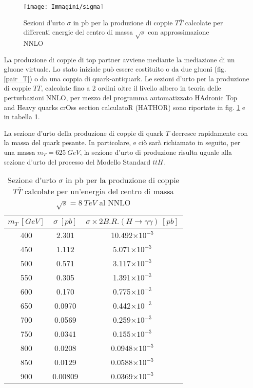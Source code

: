 \begin{figure}[!htbp]
\begin{center}
\texttt{[image: Immagini/sigma]}
\end{center}
\caption{Sezioni d'urto $\sigma$ in pb per la produzione di coppie $T\bar{T}$ calcolate per differenti energie
del centro di massa $\sqrt{s}$ con approssimazione NNLO}
\label{pair_T_sigmas}
\end{figure}

\medskip
La produzione di coppie di top partner avviene mediante la mediazione di un gluone virtuale. Lo stato iniziale può essere costituito o
da due gluoni (fig. \ref{pair_T}) o da una coppia di quark-antiquark.
\newline
Le sezioni d'urto per la produzione di coppie $T\bar{T}$, calcolate fino a 2 ordini oltre il livello albero in teoria delle perturbazioni \acs{NNLO}, per mezzo del 
programma automatizzato HAdronic Top and Heavy
quarks crOss section calculatoR (HATHOR) \cite{sigmas} sono riportate in fig. \ref{pair_T_sigmas} e in tabella \ref{cross_tab}.


\medskip
La sezione d'urto della produzione di coppie di quark $T$ decresce rapidamente con la massa del quark pesante.
\newline
In particolare, e ciò sarà richiamato in seguito, per una massa $m_{T}=625 ~GeV$, la sezione d'urto
di produzione risulta uguale alla sezione d'urto del processo del Modello Standard $t\bar{t}H$.


\begin {table}[!hbtp]
\begin{center}
\begin{tabular}{ccc}
\hline
$m_{T} ~[GeV]$ & $\sigma ~[pb]$ &$\sigma\times 2 B.R.(H\rightarrow\gamma\gamma) ~[pb]$\\
\hline
400 & 2.301& 10.492$\times 10^{-3}$\\
450 & 1.112& 5.071$\times 10^{-3}$\\
500 & 0.571& 3.117$\times 10^{-3}$\\
550 & 0.305& 1.391$\times 10^{-3}$\\
600 & 0.170& 0.775$\times 10^{-3}$\\
650 & 0.0970& 0.442$\times 10^{-3}$\\
700 & 0.0569& 0.259$\times 10^{-3}$\\
750 & 0.0341& 0.155$\times 10^{-3}$\\
800 & 0.0208& 0.0948$\times 10^{-3}$\\
850 & 0.0129& 0.0588$\times 10^{-3}$\\
900 & 0.00809& 0.0369$\times 10^{-3}$\\
\hline
\end{tabular}
\caption{Sezione d'urto $\sigma$ in pb per la produzione di coppie $T\bar{T}$ calcolate per un'energia del centro di massa
$\sqrt{s}=8 ~TeV$ al \ac{NNLO} \label{cross_tab}}
\end{center}
\end{table}

